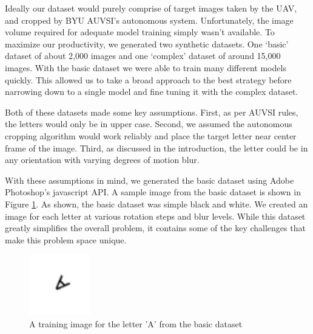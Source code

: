 \documentclass{article}
\begin{document}
Ideally our dataset would purely comprise of target images taken by the UAV, and cropped by BYU 
AUVSI’s autonomous system. Unfortunately, the image volume required for adequate model training 
simply wasn’t available. To maximize our productivity, we generated two synthetic datasets. One 
‘basic’ dataset of about 2,000 images and one ‘complex’ dataset of around 15,000 images. With 
the basic dataset we were able to train many different models quickly. This allowed us to take a 
broad approach to the best strategy before narrowing down to a single model and fine tuning it with 
the complex dataset.

Both of these datasets made some key assumptions. First, as per AUVSI rules, the letters would only 
be in upper case. Second, we assumed the autonomous cropping algorithm would work reliably and place 
the target letter near center frame of the image. Third, as discussed in the introduction, the letter 
could be in any orientation with varying degrees of motion blur.

With these assumptions in mind, we generated the basic dataset using Adobe Photoshop’s javascript API. 
A sample image from the basic dataset is shown  in Figure \ref{fig:basicDataset}. As shown, the basic dataset was simple 
black and white. We created an image for each letter at various rotation steps and blur levels. While 
this dataset greatly simplifies the overall problem, it contains some of the key challenges that make 
this problem space unique.

\begin{figure}[H]
  \begin{center}
  \includegraphics[width=0.7\linewidth]{./figs/basicDatasetSample.jpeg}
  \caption{A training image for the letter 'A' from the basic dataset}
  \label{fig:basicDataset}
  \end{center}
\end{figure}
\end{document}
